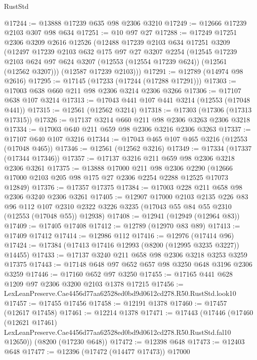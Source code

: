 \begin{lexlean}{RustStd}
\begin{coremodule}
@17244 := @13888 @17239 @635 @98 @2306 @3210
@17249 := @12666 @17239 @2103 @307 @98 @634
@17251 := @10 @97 @27
@17288 := @17249
    @17251
    @2306
    @3209
    @2616
    @12526
    (@12488
      @17239
      @2103
      @634
      @17251
      @3209
      (@12497
        @17239
        @2103
        @632
        @175
        @97
        @27
        @3207
        @2254
        (@12545
          @17239
          @2103
          @624
          @97
          @624
          @3207
          (@12553 (@12554 @17239 @624))
          (@12561 (@12562 @3207)))
        (@12587 @17239 @2103)))
@17291 := @12789 (@14974 @98 @2616)
@17295 := @17145 (@17233 (@17244 (@17288 @17291)))
@17303 := @17003 @638 @660 @211 @98 @2306 @3214 @2306 @3266
@17306 := @17107 @638 @107 @3214
@17313 := @17043 @441 @107 @441 @3214 (@12553 (@17048 @441))
@17315 := @12561 (@12562 @3214)
@17318 := @17303 (@17306 (@17313 @17315))
@17326 := @17137 @3214 @660 @211 @98 @2306 @3263 @2306 @3218
@17334 := @17003 @640 @211 @659 @98 @2306 @3216 @2306 @3263
@17337 := @17107 @640 @107 @3216
@17344 := @17043 @465 @107 @465 @3216 (@12553 (@17048 @465))
@17346 := @12561 (@12562 @3216)
@17349 := @17334 (@17337 (@17344 @17346))
@17357 := @17137 @3216 @211 @659 @98 @2306 @3218 @2306 @3261
@17375 := @13888
    @17000
    @211
    @98
    @2306
    @2290
    (@12666 @17000 @2103 @205 @98 @175 @27 @2306 @2254 @2288 @12525 @17073 @12849)
@17376 := @17357 @17375
@17384 := @17003 @228 @211 @658 @98 @2306 @3240 @2306 @3261
@17405 := @12907
    @17000
    @2103
    @2135
    @226
    @83
    @96
    @112
    @107
    @2310
    @2322
    @3226
    @3235
    (@17043 @55 @84 @55 @2310 (@12553 (@17048 @55)) @12938)
@17408 := @12941 (@12949 (@12964 @83))
@17409 := @17405 @17408
@17412 := @12789 (@12970 @83 @89)
@17413 := @17409 @17412
@17414 := @12986 @112
@17416 := @12976 (@17414 @96)
@17424 := @17384 (@17413 @17416 @12993 (@8200 (@12995 @3235 @3227)) @14455)
@17433 := @17137 @3240 @211 @658 @98 @2306 @3218 @3253 @3259 @17375
@17443 := @17148 @648 @97 @652 @657 @98 @3250 @648 @3196 @2306 @3259
@17446 := @17160 @652 @97 @3250
@17455 := @17165 @441 @628 @1209 @97 @2306 @3200 @2103 @1378 @17215
@17456 := LexLeanPreserve.Cae4456d77aa62528ed0bd9d0612cd278.R50.RustStd.look10
@17457 := @17455 @17456
@17458 := @12191 @1378
@17460 := @17457 (@12617 @17458)
@17461 := @12214 @1378
@17471 := @17443
    (@17446
      (@17460
        (@12621 @17461)
        LexLeanPreserve.Cae4456d77aa62528ed0bd9d0612cd278.R50.RustStd.fal10
        @12650))
    (@8200 (@17230 @648))
@17472 := @12398 @648
@17473 := @12403 @648
@17477 := @12396 (@17472 (@14477 @17473)) @17000

\end{coremodule}
\end{lexlean}
